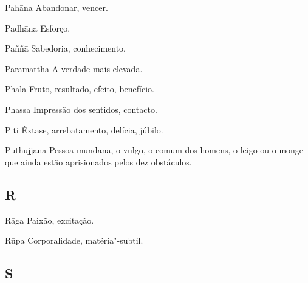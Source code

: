 \begin{glossarydescription}

\item[Pahāna] Abandonar, vencer.

\item[Padhāna] Esforço.

\item[Paññā] Sabedoria, conhecimento.

\item[Paramattha] A verdade mais elevada.

\item[Phala] Fruto, resultado, efeito, benefício.

\item[Phassa] Impressão dos sentidos, contacto.

\item[Pīti] Êxtase, arrebatamento, delícia, júbilo.

\item[Puthujjana] Pessoa mundana, o vulgo, o comum dos homens, o leigo ou o
monge que ainda estão aprisionados pelos dez obstáculos.

\end{glossarydescription}

\subsection{R}

\begin{glossarydescription}

\item[Rāga] Paixão, excitação.

\item[Rūpa] Corporalidade, matéria"-subtil.

\end{glossarydescription}

\subsection{S}

